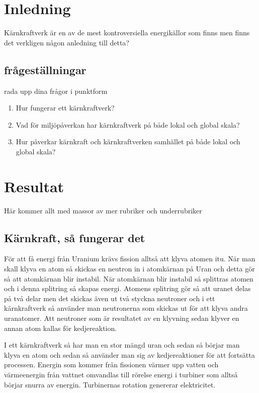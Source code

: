\documentclass[11p]{article}
\begin{document}
    \section{Inledning}
    Kärnkraftverk är en av de mest kontroversiella energikällor som finns men finns det verkligen någon anledning till detta?
    \subsection{frågeställningar}
    rada upp dina frågor i punktform
    \begin{enumerate}
        \item Hur fungerar ett kärnkraftverk?
        \item Vad för miljöpåverkan har kärnkraftverk på både lokal och global skala?
        \item Hur påverkar kärnkraft och kärnkraftverken samhället på både lokal och global skala?
    \end{enumerate}

    \section{Resultat}
    Här kommer allt med massor av mer rubriker och underrubriker
    \subsection{Kärnkraft, så fungerar det}
    För att få energi från Uranium krävs fission alltså att klyva atomen itu.
    När man skall klyva en atom så skickas en neutron in i atomkärnan på Uran och detta gör så att atomkärnan blir instabil.
    När atomkärnan blir instabil så splittras atomen och i denna splitring så skapas energi.
    Atomens splitring gör så att uranet delas på två delar men det skickas även ut två styckna neutroner och i ett kärnkraftverk så använder man neutronerna som skickas ut för att klyva andra uranatomer.
    Att neutroner som är resultatet av en klyvning sedan klyver en annan atom kallas för kedjereaktion.

    I ett kärnkraftverk så har man en stor mängd uran och sedan så börjar man klyva en atom och sedan så använder man sig av kedjereaktioner för att fortsätta processen.
    Energin som kommer från fissionen värmer upp vatten och värmeenergin från vattnet omvandlas till rörelse energi i turbiner som alltså börjar snurra av energin.
    Turbinernas rotation genererar elektricitet.
\end{document}
